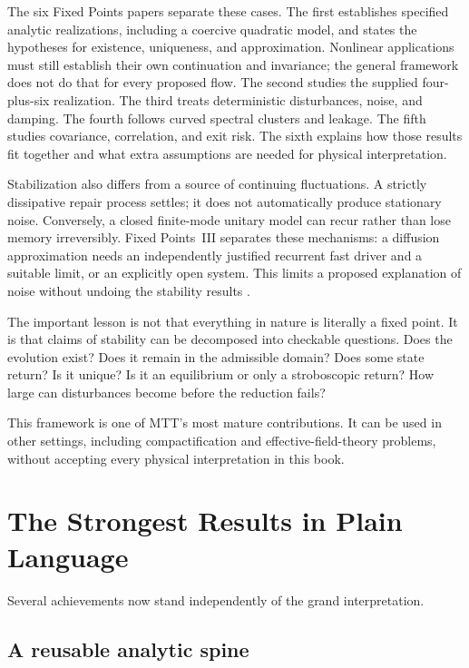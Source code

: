 \documentclass[11pt,openany]{book}
\begin{document}
The six Fixed Points papers separate these cases. The first establishes
specified analytic realizations, including a coercive quadratic model, and
states the hypotheses for existence, uniqueness, and approximation.
Nonlinear applications must still establish their own continuation and
invariance; the general framework does not do that for every proposed flow.
The second studies the supplied four-plus-six
realization. The third treats deterministic disturbances, noise, and damping.
The fourth follows curved spectral clusters and leakage. The fifth studies
covariance, correlation, and exit risk. The sixth explains how those results
fit together and what extra assumptions are needed for physical
interpretation.

Stabilization also differs from a source of continuing fluctuations. A
strictly dissipative repair process settles; it does not automatically
produce stationary noise. Conversely, a closed finite-mode unitary model
can recur rather than lose memory irreversibly. Fixed Points~III separates
these mechanisms: a diffusion approximation needs an independently
justified recurrent fast driver and a suitable limit, or an explicitly
open system. This limits a proposed explanation of noise without undoing
the stability results \cite{FixedPoints2026}.

The important lesson is not that everything in nature is literally a fixed
point. It is that claims of stability can be decomposed into checkable
questions. Does the evolution exist? Does it remain in the admissible domain?
Does some state return? Is it unique? Is it an equilibrium or only a
stroboscopic return? How large can disturbances become before the reduction
fails?

This framework is one of MTT's most mature contributions. It can be used in
other settings, including compactification and effective-field-theory
problems, without accepting every physical interpretation in this book.

\chapter{The Strongest Results in Plain Language}

Several achievements now stand independently of the grand interpretation.

\section*{A reusable analytic spine}
\end{document}
